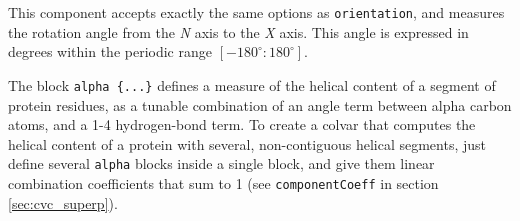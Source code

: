 
This component accepts exactly the same options as \texttt{orientation}, and 
measures the rotation angle from the \textit{N} axis to the \textit{X} axis. 
This angle is expressed in degrees within the periodic range 
$[-180^{\circ}:180^{\circ}]$.

\begin{cvcoptions}
\item %
\item %
\item %
\end{cvcoptions}






The block \texttt{alpha~\{...\}} defines a measure of the helical content of a segment of
protein residues, as a tunable combination of an angle term between alpha carbon atoms, and a
1-4 hydrogen-bond term.
To create a colvar that computes the helical content of a protein with several,
non-contiguous helical segments, just define several \texttt{alpha} blocks inside a single  block,
and give them linear combination coefficients that sum to 1 (see \texttt{componentCoeff} in section \ref{sec:cvc_superp}).

